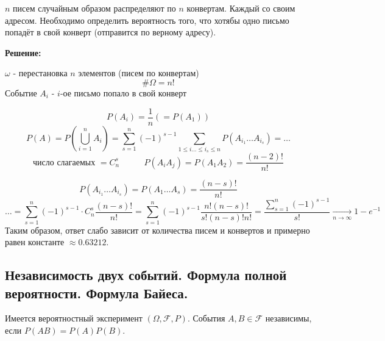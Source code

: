 \begin{exmp}
	$n$ писем случайным образом распределяют по $n$ конвертам. Каждый со своим адресом. Необходимо определить вероятность того, что хотябы одно письмо попадёт в свой конверт (отправится по верному адресу).
	
	\textbf{Решение:}
	
	\noindent $\omega$ - перестановка $n$ элементов (писем по конвертам)
	\[ \# \Omega = n! \]
	Событие $A_i$ - $i$-ое письмо попало в свой конверт
	\begin{figure}[H]
	\end{figure}
	\[ P(A_i) = \frac{1}{n} (= P(A_1)) \]
	\[ P(A) = P \left( \bigcup\limits_{i=1}^{n} A_i \right) = \sum\limits_{s=1}^{n} (-1)^{s-1} \sum\limits_{1 \le i \dots \le i_s \le n} P(A_{i_1} \dots A_{i_s}) = \dots \]
	\[ \text{число слагаемых } = C_{n}^{s} ~~~~~~~~~~~~~ P(A_i A_j) = P(A_1 A_2) = \frac{(n-2)!}{n!} \]
	\begin{figure}[H]
	\end{figure}
	\[ P(A_{i_1} \dots A_{i_s}) = P(A_1 \dots A_s) = \frac{(n-s)!}{n!} \]
	\[ \dots = \sum\limits_{s=1}^{n} (-1)^{s-1} \cdot C_{n}^{s} \frac{(n-s)!}{n!} = \sum\limits_{s=1}^{n} (-1)^{s-1} \frac{n! (n-s)!}{s! (n-s)! n!} = \frac{\sum\limits_{s=1}^{n} (-1)^{s-1}}{s!} \underset{n \to \infty}{\to} 1 - e^{-1} \]
	Таким образом, ответ слабо зависит от количества писем и конвертов и примерно равен константе $\approx 0.63212$.
\end{exmp}

\subsection{Независимость двух событий. Формула полной вероятности. Формула Байеса.}

\begin{definition}
	Имеется вероятностный эксперимент $(\Omega, \mathcal{F}, P)$. События $A, B \in \mathcal{F}$ независимы, если $P(AB) = P(A) P(B)$.
\end{definition}


